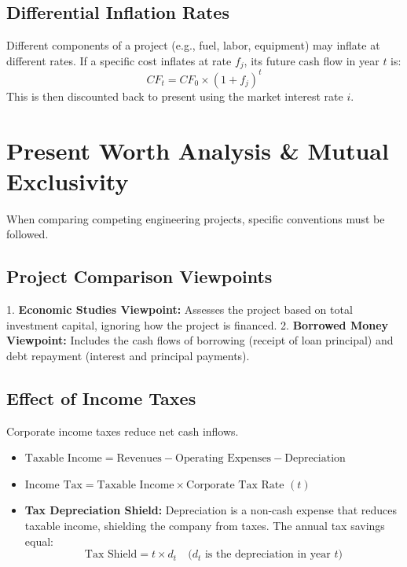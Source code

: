 \documentclass[12pt,a4paper]{article}
\begin{document}
\subsection{Differential Inflation Rates}
Different components of a project (e.g., fuel, labor, equipment) may inflate at different rates. If a specific cost inflates at rate $f_j$, its future cash flow in year $t$ is:
\begin{equation}
  CF_t = CF_0 \times (1 + f_j)^t
\end{equation}
This is then discounted back to present using the market interest rate $i$.

\section{Present Worth Analysis \& Mutual Exclusivity}

When comparing competing engineering projects, specific conventions must be followed.

\subsection{Project Comparison Viewpoints}
1.  \textbf{Economic Studies Viewpoint:} Assesses the project based on total investment capital, ignoring how the project is financed.
2.  \textbf{Borrowed Money Viewpoint:} Includes the cash flows of borrowing (receipt of loan principal) and debt repayment (interest and principal payments).

\subsection{Effect of Income Taxes}
Corporate income taxes reduce net cash inflows.
\begin{itemize}[leftmargin=*, itemsep=4pt]
  \item $\text{Taxable Income} = \text{Revenues} - \text{Operating Expenses} - \text{Depreciation}$
  \item $\text{Income Tax} = \text{Taxable Income} \times \text{Corporate Tax Rate } (t)$
  \item \textbf{Tax Depreciation Shield:} Depreciation is a non-cash expense that reduces taxable income, shielding the company from taxes. The annual tax savings equal:
    \begin{equation}
      \text{Tax Shield} = t \times d_t \quad \text{($d_t$ is the depreciation in year $t$)}
    \end{equation}
\end{itemize}
\end{document}
